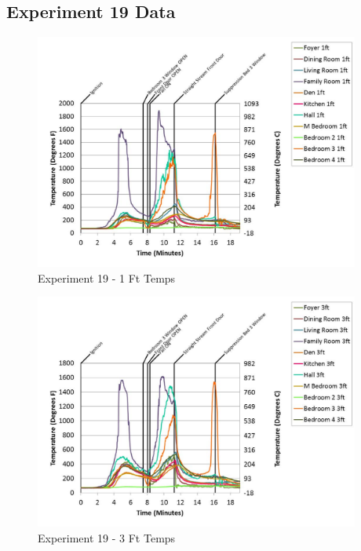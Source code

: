 \documentclass{article}
\begin{document}
\begin{appendices}
	\clearpage

		\clearpage
\clearpage		\large
\subsection{Experiment 19 Data} \label{App:Exp19Results} 

	\begin{figure}[h!]
		\centering
		\includegraphics[height=3.05in]{0_Images/Results_Charts/Exp_19_Charts/1FtTemps.pdf}
		\caption{Experiment 19 - 1 Ft Temps}
	\end{figure}
 

	\begin{figure}[h!]
		\centering
		\includegraphics[height=3.05in]{0_Images/Results_Charts/Exp_19_Charts/3FtTemps.pdf}
		\caption{Experiment 19 - 3 Ft Temps}
	\end{figure}
 
	\clearpage


\end{appendices}
\end{document}
